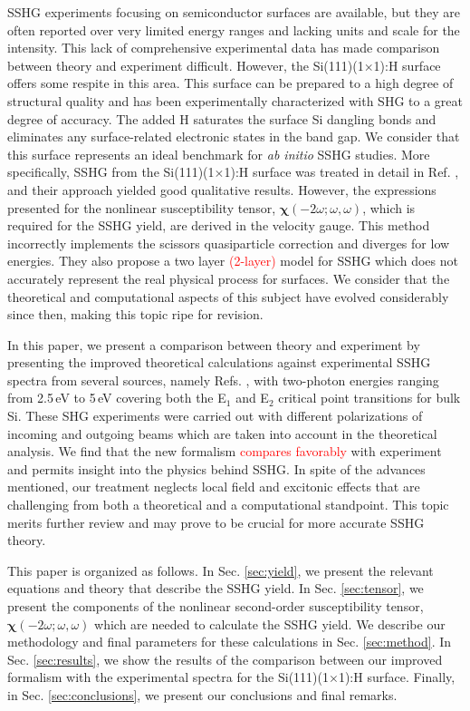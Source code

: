 \documentclass[prb,superscriptaddress,showpacs,twocolumn,letterpaper]{revtex4}
\newcommand{\correction}[1]{\textcolor{red}{#1}}
\newcommand{\change}[1]{\textcolor{red}{#1}}
\begin{document}
SSHG experiments focusing on semiconductor surfaces are available, but they are
often reported over very limited energy ranges and lacking units and scale for
the intensity. This lack of comprehensive experimental data has made comparison
between theory and experiment difficult. However, the Si(111)(1$\times$1):H
surface offers some respite in this area. This surface can be prepared to a high
degree of structural quality and has been experimentally characterized with SHG
to a great degree of accuracy.\cite{mitchellSS01, mejiaPRB02} The added H
saturates the surface Si dangling bonds and eliminates any surface-related
electronic states in the band gap. We consider that this surface represents an
ideal benchmark for \emph{ab initio} SSHG studies. More specifically, SSHG from
the Si(111)(1$\times$1):H surface was treated in detail in Ref.
, and their approach yielded good qualitative results.
However, the expressions presented for the nonlinear susceptibility tensor,
$\boldsymbol{\chi}(-2\omega;\omega,\omega)$, which is required for the SSHG
yield, are derived in the velocity gauge. This method incorrectly implements the
scissors quasiparticle correction and diverges for low
energies.\cite{cabellosPRB09} They also propose a two layer 
\correction{
(2-layer) 
}
model
for
SSHG which does not accurately represent the real physical process for surfaces.
We consider that the theoretical and computational aspects of this subject have
evolved considerably since then, making this topic ripe for revision.

In this paper, we present a comparison between theory and experiment by
presenting the improved theoretical calculations against experimental SSHG
spectra from several sources, namely Refs. , with two-photon energies ranging from
2.5\,eV to 5\,eV covering both the E$_{1}$ and E$_{2}$ critical point
transitions for bulk Si. These SHG experiments were carried out with different
polarizations of incoming and outgoing beams which are taken into account in the
theoretical analysis. We find that the new formalism
\change{compares favorably} %
with experiment and permits insight into the physics behind SSHG. In spite of
the advances mentioned, our treatment neglects local field and excitonic effects
that are challenging from both a theoretical and a computational standpoint.
This topic merits further review and may prove to be crucial for more accurate
SSHG theory.

This paper is organized as follows. In Sec. \ref{sec:yield}, we present the
relevant equations and theory that describe the SSHG yield. In Sec.
\ref{sec:tensor}, we present the components of the nonlinear second-order
susceptibility tensor, $\boldsymbol{\chi}(-2\omega;\omega,\omega)$ which are
needed to calculate the SSHG yield. We describe our methodology and final
parameters for these calculations in Sec. \ref{sec:method}. In Sec.
\ref{sec:results}, we show the results of the comparison between our improved
formalism with the experimental spectra for the Si(111)(1$\times$1):H surface.
Finally, in Sec. \ref{sec:conclusions}, we present our conclusions and final
remarks.
\end{document}
